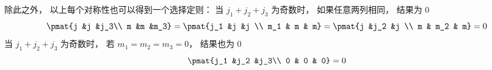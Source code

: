 除此之外， 以上每个对称性也可以得到一个选择定则： 当 $j_1 + j_2 + j_3$ 为奇数时， 如果任意两列相同， 结果为 0
\begin{equation}\label{ThreeJ_eq7}
\pmat{j &j &j_3\\ m &m &m_3} = \pmat{j_1 &j &j \\ m_1 & m & m} =  \pmat{j &j_2 &j \\ m & m_2 & m} = 0
\end{equation}
当 $j_1 + j_2 + j_3$ 为奇数时， 若 $m_1 = m_2 = m_3 = 0$， 结果也为 0
\begin{equation}\label{ThreeJ_eq8}
\pmat{j_1 &j_2 &j_3\\ 0 & 0 & 0} = 0
\end{equation}
